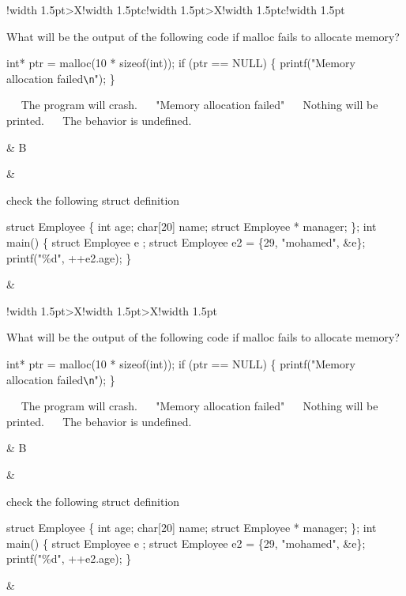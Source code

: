 \documentclass[12pt, answers]{exam}
\newcommand{\qtable}[1]{
    {
        \ifprintanswers
            \setlength{\linewidth}{\linewidth+4cm}
            \noindent
            \hskip-1.7cm
            \begin{tabularx}{\linewidth}{!{\vrule width 1.5pt}>{\hsize=1\hsize}X!{\vrule width 1.5pt}c!{\vrule width 1.5pt}>{\hsize=1\hsize}X!{\vrule width 1.5pt}c!{\vrule width 1.5pt}}
                #1
            \end{tabularx}
        \else
            \setlength{\linewidth}{\linewidth+2cm}
            \noindent
            \hskip-1cm
            \begin{tabularx}{\linewidth}{!{\vrule width 1.5pt}>{\hsize=1\hsize}X!{\vrule width 1.5pt}>{\hsize=1\hsize}X!{\vrule width 1.5pt}}
                #1
            \end{tabularx}
        \fi
    }
}
\newcommand{\choicesetter}[1]{
    & #1
}
\newcommand{\setchoice}[1]{
    \ifprintanswers
        \choicesetter{#1}
    \fi
}
\newcommand{\hsep}[1]{\noalign{\hrule height #1pt}}
\newcommand{\ftab}{\phantom{~~~~}}
\newcommand{\ttab}{\phantom{~~}}
\newcommand{\n}{\newline}
\newcommand{\snippet}[1]{
    {
        \fontsize{10}{13}\selectfont
        \bfseries
        \ttfamily
        #1
    }
}
\newcommand{\mchoices}[1]{
    {
        \normalfont
        \begin{oneparchoices}
            #1
        \end{oneparchoices}
    }
}
\begin{document}
\begin{questions}
    \qtable{
        \hsep{1.5}
        {
            \question What will be the output of the following code if malloc fails to allocate memory?\n
            \snippet{
                \ttab int* ptr = malloc(10 * sizeof(int));\n
                \ttab if (ptr == NULL) \{\n
                \ftab printf("Memory allocation failed\verb|\n|");\n
                \ttab \}\n
            }\n
            \mchoices{
                \choice~~ The program will crash.\n
                \choice~~ "Memory allocation failed"\n
                \choice~~ Nothing will be printed.\n
                \choice~~ The behavior is undefined.
            }
        } \setchoice{B}
        &
        {
            \question check the following struct definition\n
            \snippet{
                struct Employee \{\n
                \ttab int age;\n
                \ttab char[20] name;\n
                \ttab struct Employee * manager;\n
                \};\n
                int main() \{\n
                struct Employee e ;\n
                struct Employee e2 = \{29, "mohamed", \&e\};\n
                printf("\%d", ++e2.age);\n
                \}\n
            }
        } \setchoice{}
    }

\end{questions}
\end{document}
